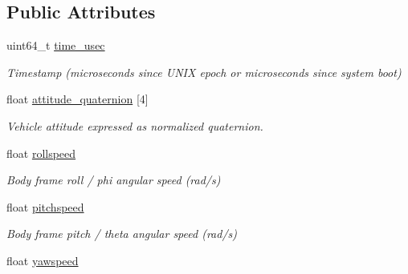 \subsection*{Public Attributes}
\begin{DoxyCompactItemize}
\item 
\hypertarget{struct____mavlink__hil__state__quaternion__t_a15c7dccf96d2c5087b171d388dd775d8}{uint64\+\_\+t \hyperlink{struct____mavlink__hil__state__quaternion__t_a15c7dccf96d2c5087b171d388dd775d8}{time\+\_\+usec}}\label{struct____mavlink__hil__state__quaternion__t_a15c7dccf96d2c5087b171d388dd775d8}

\begin{DoxyCompactList}\small\item\em Timestamp (microseconds since U\+N\+I\+X epoch or microseconds since system boot) \end{DoxyCompactList}\item 
\hypertarget{struct____mavlink__hil__state__quaternion__t_a52878cf5515b47e1db662b326c169e64}{float \hyperlink{struct____mavlink__hil__state__quaternion__t_a52878cf5515b47e1db662b326c169e64}{attitude\+\_\+quaternion} \mbox{[}4\mbox{]}}\label{struct____mavlink__hil__state__quaternion__t_a52878cf5515b47e1db662b326c169e64}

\begin{DoxyCompactList}\small\item\em Vehicle attitude expressed as normalized quaternion. \end{DoxyCompactList}\item 
\hypertarget{struct____mavlink__hil__state__quaternion__t_a83042286abfe3545cabe2d4e5a087f12}{float \hyperlink{struct____mavlink__hil__state__quaternion__t_a83042286abfe3545cabe2d4e5a087f12}{rollspeed}}\label{struct____mavlink__hil__state__quaternion__t_a83042286abfe3545cabe2d4e5a087f12}

\begin{DoxyCompactList}\small\item\em Body frame roll / phi angular speed (rad/s) \end{DoxyCompactList}\item 
\hypertarget{struct____mavlink__hil__state__quaternion__t_a68900f55507fd4fb1dfcf1687fb292ed}{float \hyperlink{struct____mavlink__hil__state__quaternion__t_a68900f55507fd4fb1dfcf1687fb292ed}{pitchspeed}}\label{struct____mavlink__hil__state__quaternion__t_a68900f55507fd4fb1dfcf1687fb292ed}

\begin{DoxyCompactList}\small\item\em Body frame pitch / theta angular speed (rad/s) \end{DoxyCompactList}\item 
\hypertarget{struct____mavlink__hil__state__quaternion__t_ab3474522e90658e09da1a3bfaa235fab}{float \hyperlink{struct____mavlink__hil__state__quaternion__t_ab3474522e90658e09da1a3bfaa235fab}{yawspeed}}\label{struct____mavlink__hil__state__quaternion__t_ab3474522e90658e09da1a3bfaa235fab}


\end{DoxyCompactItemize}
